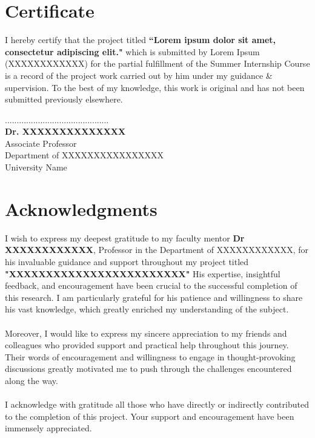 \documentclass[12pt]{report}
\begin{document}

\newpage

\chapter*{Certificate}
\vspace{1.5cm}
I hereby certify that the project titled \textbf{``Lorem ipsum dolor sit amet, consectetur adipiscing elit."} which is submitted by Lorem Ipsum (XXXXXXXXXXXX) for the partial fulfillment of the Summer Internship Course is a record of the project work carried out by him under my guidance \& supervision. To the best of my knowledge, this work is original and has not been submitted previously elsewhere.
                        
\begin{center}
\vspace{3cm}
............................................\\
\textbf{Dr. XXXXXXXXXXXXXX}\\
Associate Professor\\
Department of XXXXXXXXXXXXXXXX \\
University Name\\
\end{center}

\newpage

\chapter*{Acknowledgments}
\bigskip
{}
I wish to express my deepest gratitude to my faculty mentor \textbf{Dr XXXXXXXXXXXX},  Professor in the Department of XXXXXXXXXXXX, for his invaluable guidance and support throughout my project titled \textbf{"XXXXXXXXXXXXXXXXXXXXXXXX"} His expertise, insightful feedback, and encouragement have been crucial to the successful completion of this research. I am particularly grateful for his patience and willingness to share his vast knowledge, which greatly enriched my understanding of the subject.
\\
\\
\noindent Moreover, I would like to express my sincere appreciation to my friends and colleagues who provided support and practical help throughout this journey. Their words of encouragement and willingness to engage in thought-provoking discussions greatly motivated me to push through the challenges encountered along the way.
\\
\\
\noindent I acknowledge with gratitude all those who have directly or indirectly contributed to the completion of this project. Your support and encouragement have been immensely appreciated.
\end{document}
